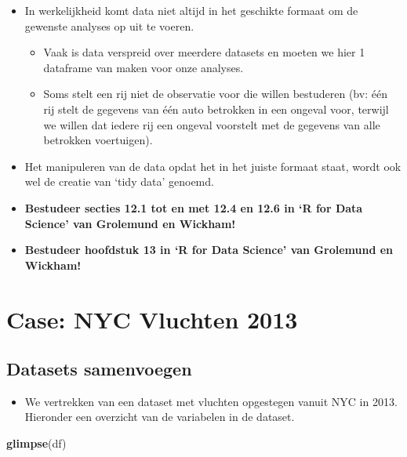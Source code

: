 \documentclass[]{tufte-book}
\newenvironment{Shaded}{}{}
\newcommand{\KeywordTok}[1]{\textcolor[rgb]{0.00,0.44,0.13}{\textbf{#1}}}
\newcommand{\NormalTok}[1]{#1}
\providecommand{\tightlist}{%
  \setlength{\itemsep}{0pt}\setlength{\parskip}{0pt}}
\begin{document}
\begin{itemize}
\tightlist
\item
  In werkelijkheid komt data niet altijd in het geschikte formaat om de gewenste analyses op uit te voeren.

  \begin{itemize}
  \tightlist
  \item
    Vaak is data verspreid over meerdere datasets en moeten we hier 1 dataframe van maken voor onze analyses.
  \item
    Soms stelt een rij niet de observatie voor die willen bestuderen (bv: één rij stelt de gegevens van één auto betrokken in een ongeval voor, terwijl we willen dat iedere rij een ongeval voorstelt met de gegevens van alle betrokken voertuigen).
  \end{itemize}
\item
  Het manipuleren van de data opdat het in het juiste formaat staat, wordt ook wel de creatie van `tidy data' genoemd.
\item
  \textbf{Bestudeer secties 12.1 tot en met 12.4 en 12.6 in `R for Data Science' van Grolemund en Wickham!}
\item
  \textbf{Bestudeer hoofdstuk 13 in `R for Data Science' van Grolemund en Wickham!}
\end{itemize}

\hypertarget{case-nyc-vluchten-2013}{%
\section{Case: NYC Vluchten 2013}\label{case-nyc-vluchten-2013}}

\hypertarget{datasets-samenvoegen}{%
\subsection{Datasets samenvoegen}\label{datasets-samenvoegen}}

\begin{itemize}
\tightlist
\item
  We vertrekken van een dataset met vluchten opgestegen vanuit NYC in 2013. Hieronder een overzicht van de variabelen in de dataset.
\end{itemize}

\begin{Shaded}
\begin{Highlighting}[]
\KeywordTok{glimpse}\NormalTok{(df)}
\end{Highlighting}
\end{Shaded}
\end{document}
